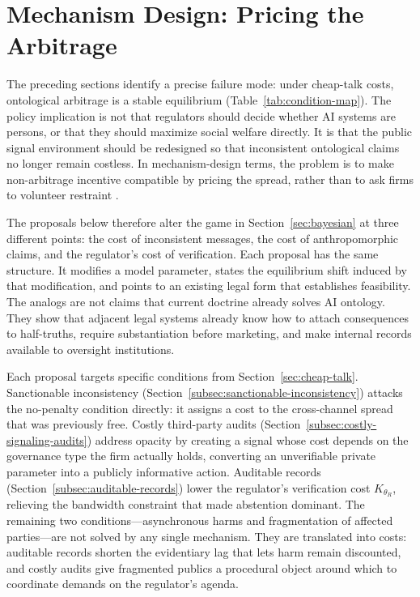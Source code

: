 \section{Mechanism Design: Pricing the Arbitrage}
\label{sec:mechanism}

The preceding sections identify a precise failure mode: under cheap-talk costs, ontological arbitrage is a stable equilibrium (Table~\ref{tab:condition-map}). The policy implication is not that regulators should decide whether AI systems
are persons, or that they should maximize social welfare directly. It is that the public signal environment should be redesigned so
that inconsistent ontological claims no longer remain costless. In
mechanism-design terms, the problem is to make non-arbitrage incentive
compatible by pricing the spread, rather than to ask firms to volunteer restraint \citep{myerson1979}.

The proposals below therefore alter the game in Section~\ref{sec:bayesian} at
three different points: the cost of inconsistent messages, the cost of
anthropomorphic claims, and the regulator's cost of verification. Each proposal
has the same structure. It modifies a model parameter, states the equilibrium
shift induced by that modification, and points to an existing legal form that
establishes feasibility. The analogs are not claims that current doctrine already
solves AI ontology. They show that adjacent legal systems already know how to
attach consequences to half-truths, require substantiation before marketing, and
make internal records available to oversight institutions.

Each proposal targets specific conditions from
Section~\ref{sec:cheap-talk}. Sanctionable inconsistency
(Section~\ref{subsec:sanctionable-inconsistency}) attacks the no-penalty
condition directly: it assigns a cost to the cross-channel spread that was
previously free. Costly third-party audits
(Section~\ref{subsec:costly-signaling-audits}) address opacity by creating a
signal whose cost depends on the governance type the firm actually holds,
converting an unverifiable private parameter into a publicly informative action.
Auditable records (Section~\ref{subsec:auditable-records}) lower the
regulator's verification cost $K_{\theta_R}$, relieving the bandwidth
constraint that made abstention dominant. The remaining two
conditions---asynchronous harms and fragmentation of affected
parties---are not solved by any single mechanism. They are translated into costs:
auditable records shorten the evidentiary lag that lets harm remain discounted, and
costly audits give fragmented publics a procedural object around which to
coordinate demands on the regulator's agenda.

